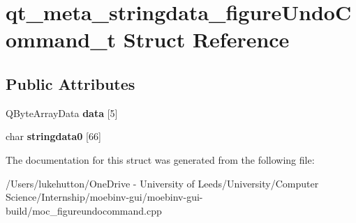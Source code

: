 \hypertarget{structqt__meta__stringdata__figure_undo_command__t}{}\section{qt\+\_\+meta\+\_\+stringdata\+\_\+figure\+Undo\+Command\+\_\+t Struct Reference}
\label{structqt__meta__stringdata__figure_undo_command__t}
\subsection*{Public Attributes}
\begin{DoxyCompactItemize}
\item 
\mbox{\label{structqt__meta__stringdata__figure_undo_command__t_ab65b436adbc0fe0249f9c76e107684a6}} 
Q\+Byte\+Array\+Data {\bfseries data} \mbox{[}5\mbox{]}
\item 
\mbox{\label{structqt__meta__stringdata__figure_undo_command__t_ad459b353f01ec3be0cc8e2aca335b6c2}} 
char {\bfseries stringdata0} \mbox{[}66\mbox{]}
\end{DoxyCompactItemize}


The documentation for this struct was generated from the following file\+:\begin{DoxyCompactItemize}
\item 
/\+Users/lukehutton/\+One\+Drive -\/ University of Leeds/\+University/\+Computer Science/\+Internship/moebinv-\/gui/moebinv-\/gui-\/build/moc\+\_\+figureundocommand.\+cpp\end{DoxyCompactItemize}
